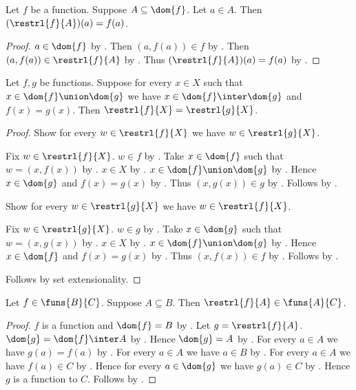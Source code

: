 \begin{proposition}\label{restrl_of_function_apply}
    Let $f$ be a function.
    Suppose $A\subseteq\dom{f}$.
    Let $a\in A$.
    Then $(\restrl{f}{A})(a) = f(a)$.
\end{proposition}
\begin{proof}
    $a\in\dom{f}$ by .
    Then $(a,f(a))\in f$ by .
    Then $(a,f(a))\in \restrl{f}{A}$ by .
    Thus $(\restrl{f}{A})(a) = f(a)$
        by .
\end{proof}

\begin{proposition}\label{restrictions_agree}
    Let $f,g$ be functions.
    Suppose for every $x\in X$ such that $x\in\dom{f}\union\dom{g}$
        we have $x\in\dom{f}\inter\dom{g}$ and $f(x)=g(x)$.
    Then $\restrl{f}{X}=\restrl{g}{X}$.
\end{proposition}
\begin{proof}
    Show for every $w\in\restrl{f}{X}$ we have $w\in\restrl{g}{X}$.
    \begin{subproof}
        Fix $w\in\restrl{f}{X}$.
        $w\in f$ by .
        Take $x\in\dom{f}$ such that $w=(x,f(x))$
            by .
        $x\in X$ by .
        $x\in\dom{f}\union\dom{g}$ by .
        Hence $x\in\dom{g}$ and $f(x)=g(x)$ by .
        Thus $(x,g(x))\in g$ by .
        Follows by .
    \end{subproof}
    Show for every $w\in\restrl{g}{X}$ we have $w\in\restrl{f}{X}$.
    \begin{subproof}
        Fix $w\in\restrl{g}{X}$.
        $w\in g$ by .
        Take $x\in\dom{g}$ such that $w=(x,g(x))$
            by .
        $x\in X$ by .
        $x\in\dom{f}\union\dom{g}$ by .
        Hence $x\in\dom{f}$ and $f(x)=g(x)$ by .
        Thus $(x,f(x))\in f$ by .
        Follows by .
    \end{subproof}
    Follows by set extensionality.
\end{proof}

\begin{proposition}\label{funs_restrl}
    Let $f\in\funs{B}{C}$.
    Suppose $A\subseteq B$.
    Then $\restrl{f}{A}\in\funs{A}{C}$.
\end{proposition}
\begin{proof}
    $f$ is a function and $\dom{f}=B$
        by .
    Let $g=\restrl{f}{A}$.
    $\dom{g}=\dom{f}\inter A$ by .
    Hence $\dom{g}=A$ by .
    For every $a\in A$ we have $g(a)=f(a)$
        by .
    For every $a\in A$ we have $a\in B$ by .
    For every $a\in A$ we have $f(a)\in C$
        by .
    Hence for every $a\in\dom{g}$ we have $g(a)\in C$ by \auto.
    Hence $g$ is a function to $C$.
    Follows by .
\end{proof}

